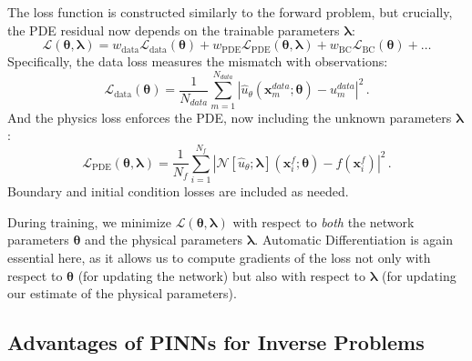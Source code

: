 The loss function is constructed similarly to the forward problem, but crucially, the PDE residual now depends on the trainable parameters $\boldsymbol{\lambda}$:
%
\begin{equation}
\mathcal{L}(\boldsymbol{\theta}, \boldsymbol{\lambda}) = w_{\text{data}}\mathcal{L}_{\text{data}}(\boldsymbol{\theta}) + w_{\text{PDE}}\mathcal{L}_{\text{PDE}}(\boldsymbol{\theta}, \boldsymbol{\lambda}) + w_{\text{BC}}\mathcal{L}_{\text{BC}}(\boldsymbol{\theta}) + \dots
\label{eq:loss_inverse}
\end{equation}
%
Specifically, the data loss measures the mismatch with observations:
%
\begin{equation*}
\mathcal{L}_{\text{data}}(\boldsymbol{\theta}) = \frac{1}{N_{data}} \sum_{m=1}^{N_{data}} \left| \hat{u}_\theta(\mathbf{x}_m^{data}; \boldsymbol{\theta}) - u_m^{data} \right|^2\,.
\end{equation*}
%
And the physics loss enforces the PDE, now including the unknown parameters $\boldsymbol{\lambda}$:
%
\begin{equation*}
\mathcal{L}_{\text{PDE}}(\boldsymbol{\theta}, \boldsymbol{\lambda}) = \frac{1}{N_{f}} \sum_{i=1}^{N_{f}} \left| \mathcal{N}[\hat{u}_\theta; \boldsymbol{\lambda}](\mathbf{x}_i^f; \boldsymbol{\theta}) - f(\mathbf{x}_i^f) \right|^2\,.
\end{equation*}
%
Boundary and initial condition losses are included as needed.

During training, we minimize $\mathcal{L}(\boldsymbol{\theta}, \boldsymbol{\lambda})$ with respect to \textit{both} the network parameters $\boldsymbol{\theta}$ and the physical parameters $\boldsymbol{\lambda}$. Automatic Differentiation is again essential here, as it allows us to compute gradients of the loss not only with respect to $\boldsymbol{\theta}$ (for updating the network) but also with respect to $\boldsymbol{\lambda}$ (for updating our estimate of the physical parameters).

\subsection{Advantages of PINNs for Inverse Problems}

